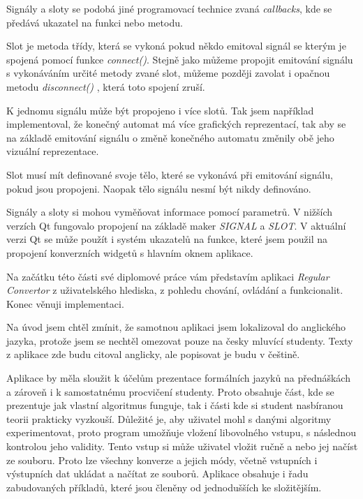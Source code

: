 
Signály a sloty se podobá jiné programovací technice zvaná \textit{callbacks}, kde se předává ukazatel na funkci nebo metodu. 

Slot je metoda třídy, která se vykoná pokud někdo emitoval signál se kterým je spojená pomocí funkce \textit{connect()}. Stejně jako můžeme propojit emitování signálu s vykonáváním určité metody zvané slot, můžeme později zavolat i opačnou metodu \textit{disconnect()} , která toto spojení zruší. 

K jednomu signálu může být propojeno i více slotů. Tak jsem například implementoval, že konečný automat má více grafických reprezentací, tak aby se na základě emitování signálu o změně konečného automatu změnily obě jeho vizuální reprezentace.

Slot musí mít definované svoje tělo, které se vykonává při emitování signálu, pokud jsou propojeni. Naopak tělo signálu nesmí být nikdy definováno.

Signály a sloty si mohou vyměňovat informace pomocí parametrů. V nižších verzích Qt fungovalo propojení na základě maker \textit{SIGNAL} a \textit{SLOT}. V aktuální verzi Qt se může použít i systém ukazatelů na funkce, které jsem použil na propojení konverzních widgetů s hlavním oknem aplikace.



Na začátku této části své diplomové práce vám představím aplikaci \textit{Regular Convertor} z uživatelského hlediska, z pohledu chování, ovládání a funkcionalit. Konec věnuji implementaci. 

Na úvod jsem chtěl zmínit, že samotnou aplikaci jsem lokalizoval do anglického jazyka, protože jsem se nechtěl omezovat pouze na česky mluvící studenty.
Texty z aplikace zde budu citoval anglicky, ale popisovat je budu v češtině. 

Aplikace by měla sloužit k účelům prezentace formálních jazyků na přednáškách a zároveň i k samostatnému procvičení studenty. Proto obsahuje část, kde se prezentuje jak vlastní algoritmus funguje, tak i části kde si student nasbíranou teorii prakticky vyzkouší. Důležité je, aby uživatel mohl s danými algoritmy experimentovat, proto program umožňuje vložení libovolného vstupu, s následnou kontrolou jeho validity. Tento vstup si může uživatel vložit ručně a nebo jej načíst ze souboru. Proto lze všechny konverze a jejich módy, včetně vstupních i výstupních dat ukládat a načítat ze souborů. Aplikace obsahuje i řadu zabudovaných příkladů, které jsou členěny od jednodušších ke složitějším.

